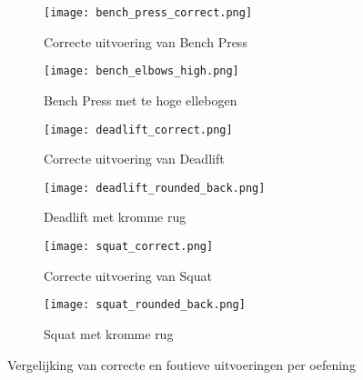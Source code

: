 \begin{figure}[H]
    \centering

    \begin{subfigure}[t]{0.45\textwidth}
        \centering
        \texttt{[image: bench\_press\_correct.png]}
        \caption{Correcte uitvoering van Bench Press}
        \label{fig:bench_correct_combined}
    \end{subfigure}
    \hfill
    \begin{subfigure}[t]{0.45\textwidth}
        \centering
        \texttt{[image: bench\_elbows\_high.png]}
        \caption{Bench Press met te hoge ellebogen}
        \label{fig:bench_elbows_high_combined}
    \end{subfigure}

    \vspace{1em} %

    \begin{subfigure}[t]{0.45\textwidth}
        \centering
        \texttt{[image: deadlift\_correct.png]}
        \caption{Correcte uitvoering van Deadlift}
        \label{fig:deadlift_correct_combined}
    \end{subfigure}
    \hfill
    \begin{subfigure}[t]{0.45\textwidth}
        \centering
        \texttt{[image: deadlift\_rounded\_back.png]}
        \caption{Deadlift met kromme rug}
        \label{fig:deadlift_rounded_back_combined}
    \end{subfigure}

    \vspace{1em}

    \begin{subfigure}[t]{0.45\textwidth}
        \centering
        \texttt{[image: squat\_correct.png]}
        \caption{Correcte uitvoering van Squat}
        \label{fig:squat_correct_combined}
    \end{subfigure}
    \hfill
    \begin{subfigure}[t]{0.45\textwidth}
        \centering
        \texttt{[image: squat\_rounded\_back.png]}
        \caption{Squat met kromme rug}
        \label{fig:squat_rounded_back_combined}
    \end{subfigure}

    \caption{Vergelijking van correcte en foutieve uitvoeringen per oefening}
    \label{fig:combined_comparison}
\end{figure}
